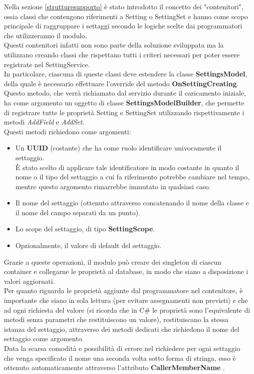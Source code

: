 \documentclass[\main/tesi.tex]{subfiles}
\begin{document}
Nella sezione \ref{strutturesupporto} è stato introdotto il concetto dei "contenitori", ossia classi che contengono riferimenti a Setting o SettingSet e hanno come scopo principale di raggruppare i settaggi secondo le logiche scelte dai programmatori che utilizzeranno il modulo.\\
Questi contenitori infatti non sono parte della soluzione sviluppata ma la utilizzano creando classi che rispettano tutti i criteri necessari per poter essere registrate nel SettingService.\\
In particolare, ciascuna di queste classi deve estendere la classe \textbf{SettingsModel}, della quale è necessario effettuare l'override del metodo \textbf{OnSettingCreating}.\\
Questo metodo, che verrà richiamato dal servizio durante il caricamento iniziale, ha come argomento un oggetto di classe \textbf{SettingsModelBuilder}, che permette di registrare tutte le proprietà Setting e SettingSet utilizzando rispettivamente i metodi \textit{AddField} e \textit{AddSet}.\\
Questi metodi richiedono come argomenti:
\begin{itemize}
    \item Un \textbf{UUID} \cite{uuid} (costante) che ha come ruolo identificare univocamente il settaggio.\\È stato scelto di applicare tale identificatore in modo costante in quanto il nome o il tipo del settaggio a cui fa riferimento potrebbe cambiare nel tempo, mentre questo argomento rimarrebbe immutato in qualsiasi caso.
    \item Il nome del settaggio (ottenuto attraverso concatenando il nome della classe e il nome del campo separati da un punto).
    \item Lo scope del settaggio, di tipo \textbf{SettingScope}.
    \item Opzionalmente, il valore di default del settaggio.\\
\end{itemize}
Grazie a queste operazioni, il modulo può creare dei singleton di ciascun container e collegarne le proprietà al database, in modo che siano a disposizione i valori aggiornati.\\
Per quanto riguarda le proprietà aggiunte dal programmatore nel contenitore, è importante che siano in sola lettura (per evitare assegnamenti non previsti) e che ad ogni richiesta del valore (si ricorda che in C\# le proprietà sono l'equivalente di metodi senza parametri che restituiscono un valore), restituiscano la stessa istanza del settaggio, attraverso dei metodi dedicati che richiedono il nome del settaggio come argomento.\\
Data la scarsa comodità e possibilità di errore nel richiedere per ogni settaggio che venga specificato il nome una seconda volta sotto forma di stringa, esso è ottenuto automaticamente attraverso l'attributo \textbf{CallerMemberName} \cite{callermembername}.
\end{document}
